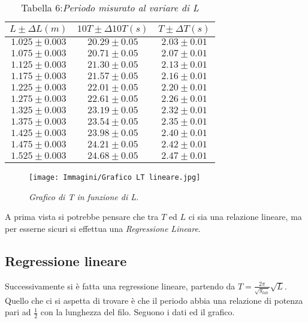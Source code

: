 \documentclass[12pt, a4paper]{article}
\begin{document}
\begin{table}[h!]
    \centering
    \begin{tabular}{|c|c|c|}
    \hline
        $ L \pm \Delta L (m) $ & $ 10T \pm \Delta10T (s)$ & $ T \pm \Delta T(s)$  \\ 
    \hline 
    $1.025 \pm 0.003$ & $20.29 \pm 0.05$ & $2.03 \pm 0.01$\\ 
    $1.075 \pm 0.003$ & $20.71 \pm 0.05$ & $2.07 \pm 0.01$\\ 
    $1.125 \pm 0.003$ & $21.30 \pm 0.05$ & $2.13 \pm 0.01$\\ 
    $1.175 \pm 0.003$ & $21.57 \pm 0.05$ & $2.16 \pm 0.01$\\ 
    $1.225\pm 0.003$ & $22.01 \pm 0.05$ & $2.20 \pm 0.01$\\ 
    $1.275 \pm 0.003$ & $22.61 \pm 0.05$ & $2.26 \pm 0.01$\\ 
    $1.325 \pm 0.003$ & $23.19 \pm 0.05$ & $2.32 \pm 0.01$\\ 
    $1.375 \pm 0.003$ & $23.54 \pm 0.05$ & $2.35 \pm 0.01$\\ 
    $1.425 \pm 0.003$ & $23.98 \pm 0.05$ & $2.40 \pm 0.01$\\ 
    $1.475 \pm 0.003$ & $24.21 \pm 0.05$ & $2.42 \pm 0.01$\\
    $1.525 \pm 0.003$ & $24.68 \pm 0.05$ & $2.47 \pm 0.01$\\
    \hline 
    \end{tabular}
    \caption*{\centering Tabella 6:\small{\textit{Periodo misurato al variare di L}}}
    \label{tab:my_label}
\end{table}



\begin{figure}[h!]
    \centering
    \texttt{[image: Immagini/Grafico LT lineare.jpg]}
    \caption{\textit{{\footnotesize{Grafico di T in funzione di L.}}}}
    \label{IndipendenzaTM}
\end{figure}


A prima vista si potrebbe pensare che tra $T$ ed $L$ ci sia una relazione lineare, ma per esserne sicuri si effettua una \textit{Regressione Lineare}.






\subsection{Regressione lineare}
Successivamente si è fatta una regressione lineare, partendo da $T= \frac{2\pi}{\sqrt{g_{tab}}}\sqrt{L}$. Quello che ci si aspetta di trovare è che il periodo abbia una relazione di potenza pari ad $\frac{1}{2}$ con la lunghezza del filo. Seguono i dati ed il grafico.
\end{document}
